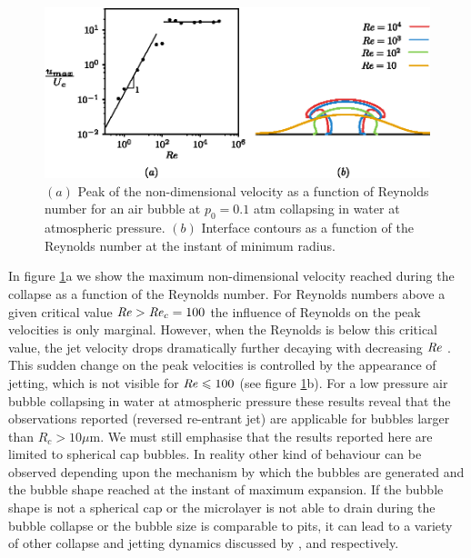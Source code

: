 \documentclass[final]{jfm}
\begin{document}
\begin{figure}
    \centering
    \includegraphics{figsv2/Fig9.eps}
    \caption{$(a)$ Peak of the non-dimensional velocity as a function of Reynolds number
    for an air bubble at $p_0=0.1$ atm collapsing in water at atmospheric pressure. $(b)$ Interface contours as a function of the Reynolds number at the instant of minimum radius.}
    \label{fig:umaxvsoh}
\end{figure}

In figure \ref{fig:umaxvsoh}a we show the maximum  non-dimensional velocity reached during the collapse as a function of the Reynolds number. 
For Reynolds numbers above a given critical value $\mbox{\textit{Re}} > \mbox{\textit{Re}}_c= 100$ the influence of Reynolds on the peak velocities is only marginal. However, when the Reynolds is below this critical value, the jet velocity drops dramatically further decaying with decreasing $\mbox{\textit{Re}}$ . This sudden change on the peak velocities is controlled by the appearance of jetting, which is not visible for $\mbox{\textit{Re}} \leqslant 100$
(see figure \ref{fig:umaxvsoh}b).
For a low pressure air bubble collapsing in water at atmospheric pressure these results reveal that the observations reported (reversed re-entrant jet) are applicable for bubbles larger than $R_c > 10 \mu$m. We must still emphasise that the results reported here are limited to spherical cap bubbles. In reality other kind of behaviour can be observed depending upon the mechanism by which the bubbles are generated and the bubble shape reached at the instant of maximum expansion. If the bubble shape is not a spherical cap or the microlayer is not able to drain during the bubble collapse or the bubble size is comparable to pits, it can lead to a variety of other collapse and jetting dynamics discussed by \citet{lechner2020jet}, \citet{reuter2021supersonic} and \cite{trummler2020near} respectively.
\end{document}
